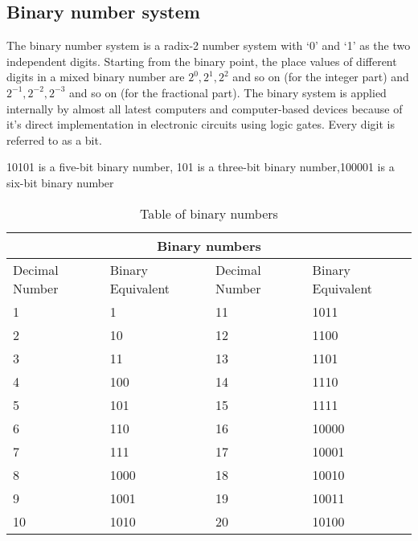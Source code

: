 \subsection{Binary number system}
The binary number system is a radix-2 number system with ‘0’ and ‘1’ as the two independent digits. Starting from the binary point, the place values of different digits in a mixed binary number are $2^{0}, 2^{1}, 2^{2}$ and so on (for the integer part) and $2^{-1}, 2^{-2}, 2^{-3}$ and so on (for the fractional part). The binary system is applied internally by almost all latest computers and computer-based devices because of it's direct implementation in electronic circuits using logic gates. Every digit is referred to as a bit.
\begin{example}
	10101 is a five-bit binary number, 101 is a three-bit binary number,100001 is a six-bit binary number
\end{example}


\setlength\arrayrulewidth{1pt}
\begin{table}[H]
	\centering
	\begin{tabular}{|p{1.5cm}|p{2cm}||p{1.5cm}|p{2cm}|}
		\hline
		\multicolumn{4}{|c|}{\textbf{Binary numbers}}\\\hline\hline
		\rowcolor{ocrel}Decimal Number&Binary Equivalent &Decimal Number&Binary Equivalent \\\hline
		\hline 1 & 1 & 11 & 1011 \\
		\hline 2 & 10 & 12 & 1100 \\
		\hline 3 & 11 & 13 & 1101 \\
		\hline 4 & 100 & 14 & 1110 \\
		\hline 5 & 101 & 15 & 1111 \\
		\hline 6 & 110 & 16 & 10000 \\
		\hline 7 & 111 & 17 & 10001 \\
		\hline 8 & 1000 & 18 & 10010 \\
		\hline 9 & 1001 & 19 & 10011 \\
		\hline 10 & 1010 & 20 & 10100 \\
		\hline
	\end{tabular}
	\caption{Table of binary numbers}
\end{table}

